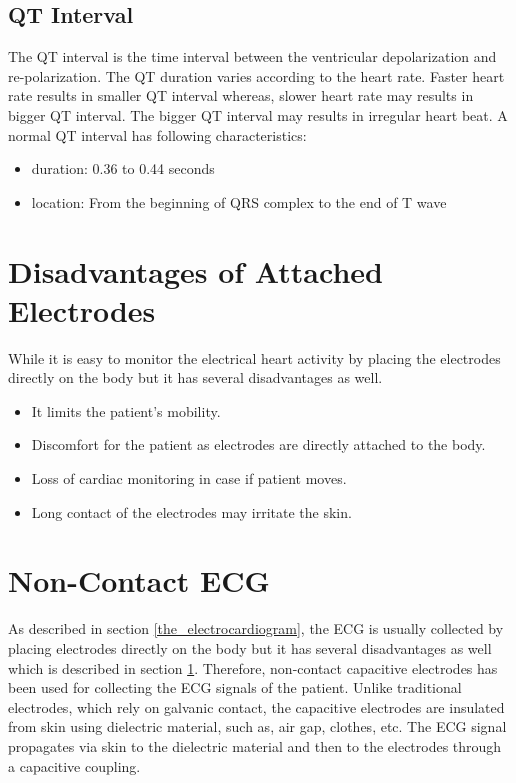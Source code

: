 \subsection{QT Interval}
The QT interval is the time interval between the ventricular depolarization and re-polarization. The QT duration varies according to the heart rate. Faster heart rate results in smaller QT interval whereas, slower heart rate may results in bigger QT interval. The bigger QT interval may results in irregular heart beat. A normal QT interval has following characteristics:

\begin{itemize}
	\item duration: 0.36 to 0.44 seconds
	\item location: From the beginning of QRS complex to the end of T wave
\end{itemize}

\section{Disadvantages of Attached Electrodes} \label{electrodes_disadv}

While it is easy to monitor the electrical heart activity by placing the electrodes directly on the body but it has several disadvantages as well.

\begin{itemize}
	\item It limits the patient's mobility.
	\item Discomfort for the patient as electrodes are directly attached to the body.
	\item Loss of cardiac monitoring in case if patient moves.
	\item Long contact of the electrodes may irritate the skin.
\end{itemize}

\section{Non-Contact ECG}
As described in section \ref{the_electrocardiogram}, the ECG is usually collected by placing electrodes directly on the body but it has several disadvantages as well which is described in section \ref{electrodes_disadv}. Therefore, non-contact capacitive electrodes has been used for collecting the ECG signals of the patient. Unlike traditional electrodes, which rely on galvanic contact, the capacitive electrodes are insulated from skin using dielectric material, such as, air gap, clothes, etc. The ECG signal propagates via skin to the dielectric material and then to the electrodes through a capacitive coupling.

